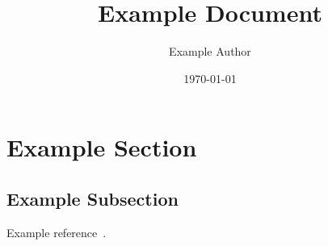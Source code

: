 \documentclass[12pt]{article}
\title{Example Document}
\author{Example Author}
\date{\today}
\begin{document}
\maketitle

\tableofcontents

\section{Example Section}

\subsection{Example Subsection}

Example reference~\cite{Example_2024}.
\blindtext{}

\printbibliography{}
\end{document}
